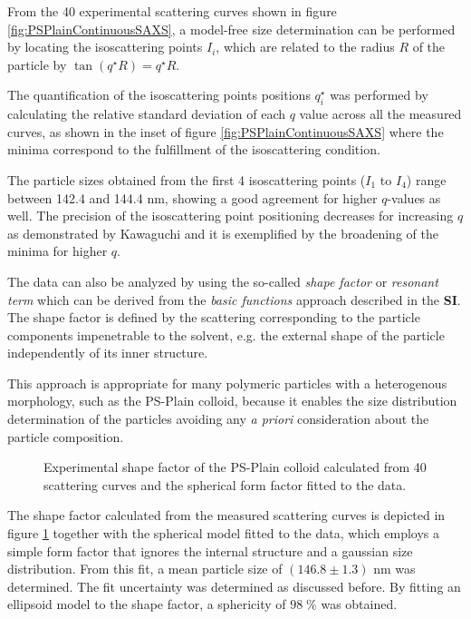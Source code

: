 From the 40 experimental scattering curves shown in figure \ref{fig:PSPlainContinuousSAXS}, a model-free size determination can be performed by locating the isoscattering points $I_i$, which are related to the radius $R$ of the particle by $\tan\left( q^{\star}R \right)=q^{\star}R$\citep{kawaguchi_xray_1983}.

The quantification of the isoscattering points positions $q_i^{\star}$ was performed by calculating the relative standard deviation of each $q$ value across all the measured curves, as shown in the inset of 
figure \ref{fig:PSPlainContinuousSAXS} where the minima correspond to the fulfillment of the isoscattering condition. 

The particle sizes obtained from the first 4 isoscattering points ($I_1$ to $I_4$) range between 142.4 and 144.4 nm, showing a good agreement for higher $q$-values as well. The precision of the isoscattering point positioning decreases for increasing $q$ as demonstrated by Kawaguchi\citep{kawaguchi_isoscattering_1992} and it is exemplified by the broadening of the minima for higher $q$.

The data can also be analyzed by using the so-called \emph{shape factor} or \emph{resonant term} which can be derived from the \emph{basic functions} approach\citep{stuhrmann_elimination_1965,stuhrmann_elimination_1967} described in the \textbf{SI}. The shape factor is defined by the scattering corresponding to the particle components impenetrable to the solvent, e.g. the external shape of the particle independently of its inner structure. 

This approach is appropriate for many polymeric particles with a heterogenous morphology\citep{bolze_situ_2004}, such as the PS-Plain colloid, because it enables the size distribution determination of the particles avoiding any \emph{a priori} consideration about the particle composition.

\begin{figure}
	\begin{center}
		
	\end{center}
	\caption{Experimental shape factor of the PS-Plain colloid calculated from 40 scattering curves and the spherical form factor fitted to the data.}
	\label{fig:PSPlainResonantTerm}
\end{figure}

The shape factor calculated from the measured scattering curves is depicted in figure \ref{fig:PSPlainResonantTerm} together with the spherical model fitted to the data, which employs a simple form factor that ignores the internal structure and a gaussian size distribution. From this fit, a mean particle size of $(146.8\pm1.3)$ nm was determined. The fit uncertainty was determined as discussed before. By fitting an ellipsoid model to the shape factor, a sphericity of $98\;\%$ was obtained.

